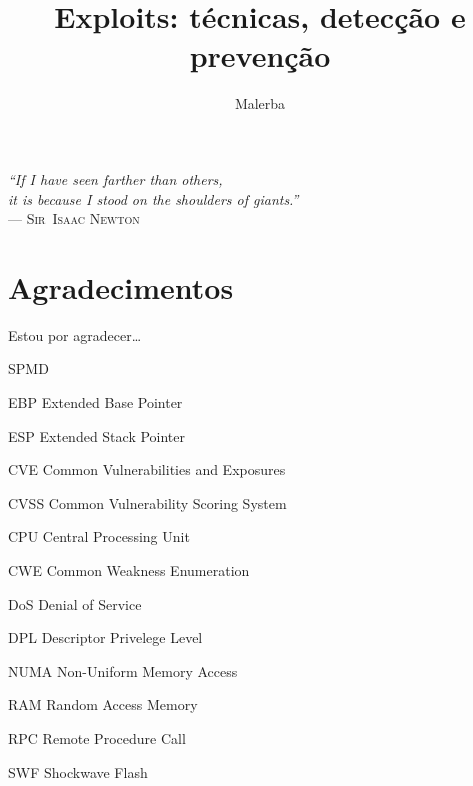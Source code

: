 \documentclass[t]{iiufrgs}
\title{Exploits: técnicas, detecção e prevenção}
\author{Malerba}{César}
\begin{document}
\maketitle

\clearpage
\begin{flushright}
\mbox{}\vfill
{\sffamily\itshape
``If I have seen farther than others,\\
it is because I stood on the shoulders of giants.''\\}
--- \textsc{Sir~Isaac Newton}
\end{flushright}

\chapter*{Agradecimentos}
Estou por agradecer\ldots

\tableofcontents

\begin{listofabbrv}{SPMD}
        \item[EBP] Extended Base Pointer
		\item[ESP] Extended Stack Pointer
		\item[CVE] Common Vulnerabilities and Exposures
		\item[CVSS] Common Vulnerability Scoring System
		\item[CPU] Central Processing Unit
		\item[CWE] Common Weakness Enumeration
		\item[DoS] Denial of Service
		\item[DPL] Descriptor Privelege Level
        \item[NUMA] Non-Uniform Memory Access
        \item[RAM] Random Access Memory
        \item[RPC] Remote Procedure Call
        \item[SWF] Shockwave Flash
\end{listofabbrv}

\end{document}

